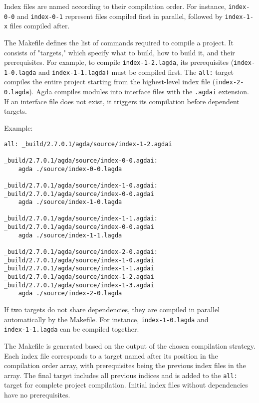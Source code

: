 Index files are named according to their compilation order. For instance,
\texttt{index-0-0} and \texttt{index-0-1} represent files compiled first in parallel, followed by
\texttt{index-1-x} files compiled after. 

The Makefile defines the list of commands required to compile a project. It
consists of "targets," which specify what to build, how to build it, and their
prerequisites. For example, to compile \texttt{index-1-2.lagda}, its
prerequisites (\texttt{index-1-0.lagda} and \texttt{index-1-1.lagda)} must be
compiled first. The \texttt{all:} target compiles the entire project starting
from the highest-level index file (\texttt{index-2-0.lagda}). Agda compiles
modules into interface files with the \texttt{.agdai} extension. If an
interface file does not exist, it triggers its compilation
before dependent targets.

Example:

\noindent
\begin{minipage}{\textwidth}
\begin{lstlisting}
all: _build/2.7.0.1/agda/source/index-1-2.agdai 

_build/2.7.0.1/agda/source/index-0-0.agdai: 
	agda ./source/index-0-0.lagda

_build/2.7.0.1/agda/source/index-1-0.agdai: _build/2.7.0.1/agda/source/index-0-0.agdai 
	agda ./source/index-1-0.lagda

_build/2.7.0.1/agda/source/index-1-1.agdai: _build/2.7.0.1/agda/source/index-0-0.agdai 
	agda ./source/index-1-1.lagda

_build/2.7.0.1/agda/source/index-2-0.agdai: _build/2.7.0.1/agda/source/index-1-0.agdai _build/2.7.0.1/agda/source/index-1-1.agdai _build/2.7.0.1/agda/source/index-1-2.agdai _build/2.7.0.1/agda/source/index-1-3.agdai 
	agda ./source/index-2-0.lagda
\end{lstlisting}
\end{minipage}

If two targets do not share dependencies, they are compiled in parallel
automatically by the Makefile. For instance, \texttt{index-1-0.lagda}
and \\\texttt{index-1-1.lagda} can be compiled together.

The Makefile is generated based on the output of the chosen compilation
strategy. Each index file corresponds to a target named after its position in
the compilation order array, with prerequisites being the previous index
files in the array. The final target includes all previous indices and is added
to the \texttt{all:} target for complete project compilation. Initial index files
without dependencies have no prerequisites.


